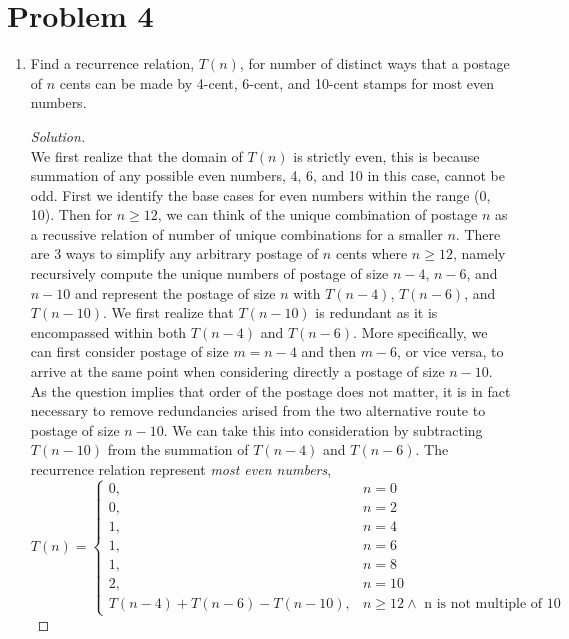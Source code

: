 \documentclass[11pt]{article}
\theoremstyle{plain}%
\theoremstyle{definition}
\theoremstyle{remark}
\newenvironment{solution}
  {\begin{proof}[Solution]}
  {\end{proof}}
\begin{document}
\section*{Problem 4}
\begin{enumerate}
  \item Find a recurrence relation, $T(n)$, for number of distinct ways that a postage of $n$ cents can be made by 4-cent, 6-cent, and 10-cent stamps for most even numbers.

  \begin{solution}
    $ $\\
    We first realize that the domain of $T(n)$ is strictly even, this is because summation of any possible even numbers, 4, 6, and 10 in this case, cannot be odd. First we identify the base cases for even numbers within the range (0, 10). Then for $n\geq 12$, we can think of the unique combination of postage $n$ as a recussive relation of number of unique combinations for a smaller $n$. There are 3 ways to simplify any arbitrary postage of $n$ cents where $n\geq 12$, namely recursively compute the unique numbers of postage of size $n-4$, $n-6$, and $n-10$ and represent the postage of size $n$ with $T(n-4)$, $T(n-6)$, and $T(n-10)$. We first realize that $T(n-10)$ is redundant as it is encompassed within both $T(n-4)$ and $T(n-6)$. More specifically, we can first consider postage of size $m = n-4$ and then $m-6$, or vice versa, to arrive at the same point when considering directly a postage of size $n-10$. As the question implies that order of the postage does not matter, it is in fact necessary to remove redundancies arised from the two alternative route to postage of size $n-10$. We can take this into consideration by subtracting $T(n-10)$ from the summation of $T(n-4)$ and $T(n-6)$. The recurrence relation represent \textit{most even numbers},
    \begin{equation*}
      T(n)=
      \begin{cases}
        0, & n=0\\
        0, & n=2\\
        1, & n=4\\
        1, & n=6\\
        1, & n=8\\
        2, & n=10\\
        T(n-4) + T(n-6) - T(n-10), & n\geq 12 \land \text{ n is not multiple of 10}
      \end{cases}
    \end{equation*}


\end{solution}
\end{enumerate}
\end{document}
